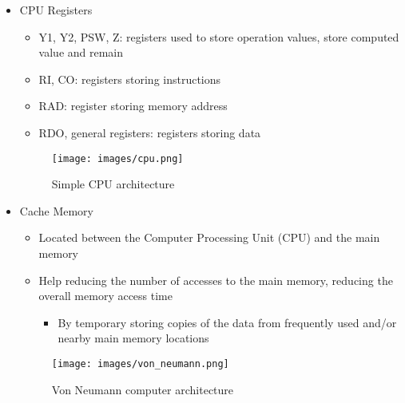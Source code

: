 \documentclass[handout]{beamer}[10pt, usepdftitle=false]
\begin{document}
	\begin{frame}
	
	\begin{itemize}
		\item {CPU Registers 
			\begin{itemize}
				\item{Y1, Y2, PSW, Z: registers used to store operation values, store computed value and remain}
				\item{RI, CO: registers storing instructions}	
				\item{RAD: register storing memory address}
				\item{RDO, general registers: registers storing data}		
			\end{itemize} 
			
	\begin{figure}
		\texttt{[image: images/cpu.png]} 
     	\vspace*{-0.5em}
		\caption{Simple CPU architecture}
	\end{figure}				
	}
	
	\end{itemize}
	
	\end{frame}

	\begin{frame}
	
	\begin{itemize}
		\item {Cache Memory
			\begin{itemize}			
				\item{Located between the Computer Processing Unit (CPU) and the main memory}
				\item{Help reducing the number of accesses to the main memory, reducing the overall memory access time
					\begin{itemize}
						\item{By temporary storing copies of the data from frequently used and/or nearby main memory locations}		
					\end{itemize}									
				}
			\end{itemize} 
			
		\begin{figure}
			\texttt{[image: images/von\_neumann.png]} 
     		\vspace*{-0.5em}
			\caption{Von Neumann computer architecture}
		\end{figure}		
		}
	
	\end{itemize}
	
	\end{frame}
\end{document}
